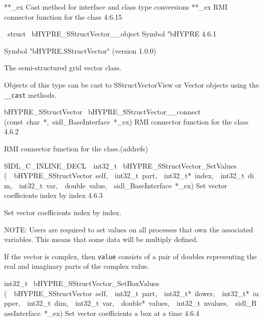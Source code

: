 \documentclass{article}
\begin{document}
\begin{cxxentry}
\begin{cxxentry}
\begin{cxxnames}
        {}
\label{cxx.4.6.36}
        {**\_ex}
        {}
        {
Cast method for interface and class type conversions}
        {}
\label{cxx.4.6.37}
        {**\_ex}
        {}
        {
RMI connector function for the class}
        {4.6.15}
\end{cxxnames}
\begin{cxxvariable}
{\ struct\ }
        {bHYPRE\_SStructVector\_\_object}
        {}
        {
Symbol "bHYPRE}
        {4.6.1}
\begin{cxxdoc}

Symbol "bHYPRE.SStructVector" (version 1.0.0)

The semi-structured grid vector class.

Objects of this type can be cast to SStructVectorView or Vector
objects using the {\tt \_\_cast} methods.
\end{cxxdoc}
\end{cxxvariable}
\begin{cxxfunction}
{bHYPRE\_SStructVector\ }
        {bHYPRE\_SStructVector\_\_connect}
        {(const\ char\ *,\ sidl\_BaseInterface\ *\_ex)}
        {
RMI connector function for the class}
        {4.6.2}
\begin{cxxdoc}

RMI connector function for the class.(addrefs)
\end{cxxdoc}
\end{cxxfunction}
\begin{cxxfunction}
{SIDL\_C\_INLINE\_DECL\ \ int32\_t\ }
        {bHYPRE\_SStructVector\_SetValues}
        {(\ \ bHYPRE\_SStructVector\ self,\ \ int32\_t\ part,\ \ int32\_t*\ index,\ \ int32\_t\ dim,\ \ int32\_t\ var,\ \ double\ value,\ \ sidl\_BaseInterface\ *\_ex)}
        {
Set vector coefficients index by index}
        {4.6.3}
\begin{cxxdoc}

Set vector coefficients index by index.

NOTE: Users are required to set values on all processes that
own the associated variables.  This means that some data will
be multiply defined.

If the vector is complex, then {\tt value} consists of a pair
of doubles representing the real and imaginary parts of the
complex value.
\end{cxxdoc}
\end{cxxfunction}
\begin{cxxfunction}
{int32\_t\ }
        {bHYPRE\_SStructVector\_SetBoxValues}
        {(\ \ bHYPRE\_SStructVector\ self,\ \ int32\_t\ part,\ \ int32\_t*\ ilower,\ \ int32\_t*\ iupper,\ \ int32\_t\ dim,\ \ int32\_t\ var,\ \ double*\ values,\ \ int32\_t\ nvalues,\ \ sidl\_BaseInterface\ *\_ex)}
        {
Set vector coefficients a box at a time}
        {4.6.4}
\begin{cxxdoc}


\end{cxxdoc}
\end{cxxfunction}
\end{cxxentry}
\end{cxxentry}
\end{document}

